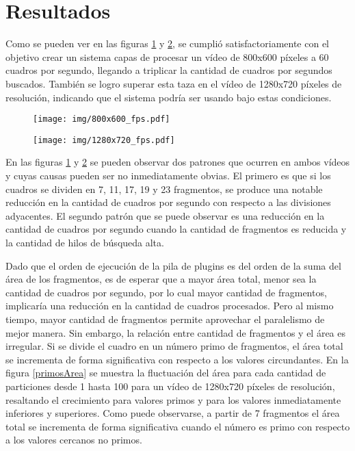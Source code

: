 \section{Resultados}

Como se pueden ver en las figuras \ref{800fps} y \ref{1280fps}, se cumplió
satisfactoriamente con el objetivo crear un sistema capas de procesar un vídeo
de 800x600 píxeles a 60 cuadros por segundo, llegando a triplicar la cantidad de
cuadros por segundos buscados. También se logro superar esta taza en el vídeo de
1280x720 píxeles de resolución, indicando que el sistema podría ser usando bajo
estas condiciones.

\begin{figure}[!h]

	\texttt{[image: img/800x600\_fps.pdf]}
	\caption{}
	\label{800fps}

\end{figure}

\begin{figure}[!h]

	\texttt{[image: img/1280x720\_fps.pdf]}
	\caption{}
	\label{1280fps}

\end{figure}

En las figuras \ref{800fps} y \ref{1280fps} se pueden observar dos patrones que
ocurren en ambos vídeos y cuyas causas pueden ser no inmediatamente obvias. El
primero es que si los cuadros se dividen en 7, 11, 17, 19 y 23 fragmentos, se
produce una notable reducción en la cantidad de cuadros por segundo con respecto
a las divisiones adyacentes. El segundo patrón que se puede observar es una
reducción en la cantidad de cuadros por segundo cuando la cantidad de fragmentos
es reducida y la cantidad de hilos de búsqueda alta.

Dado que el orden de ejecución de la pila de plugins es del orden de la suma del
área de los fragmentos, es de esperar que a mayor área total, menor sea la
cantidad de cuadros por segundo, por lo cual mayor cantidad de fragmentos,
implicaría una reducción en la cantidad de cuadros procesados. Pero al mismo
tiempo, mayor cantidad de fragmentos permite aprovechar el paralelismo de mejor
manera. Sin embargo, la relación entre cantidad de fragmentos y el área es
irregular. Si se divide el cuadro en un número primo de fragmentos, el área
total se incrementa de forma significativa con respecto a los valores
circundantes. En la figura \ref{primosArea} se muestra la fluctuación del área
para cada cantidad de particiones desde 1 hasta 100 para un vídeo de 1280x720
píxeles de resolución, resaltando el crecimiento para valores primos y para los
valores inmediatamente inferiores y superiores. Como puede observarse, a partir
de 7 fragmentos el área total se incrementa de forma significativa cuando el
número es primo con respecto a los valores cercanos no primos.

